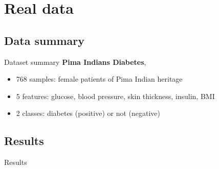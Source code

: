 \section{Real data}

\subsection{Data summary}

\begin{frame}{Dataset summary}
  \textbf{Pima Indians Diabetes}, \cite{smith1988}
  \begin{itemize}
    \item 768 samples: female patients of Pima Indian heritage
    \item 5 features: glucose, blood pressure, skin thickness, insulin, BMI
    \item 2 classes: diabetes (positive) or not (negative)
  \end{itemize}
\end{frame}

\subsection{Results}

\begin{frame}{Results}
  \begin{table}[!htbp]
    \centering
    \caption{Results for 10-fold cross-validation}
  \end{table}
\end{frame}
